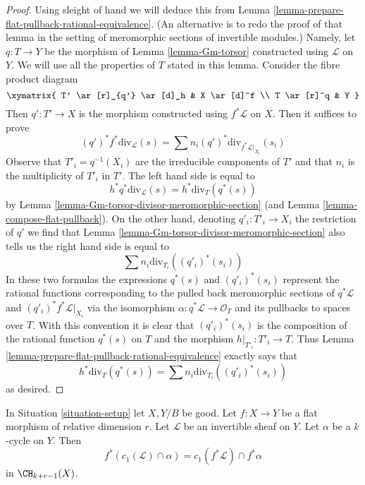 \begin{proof}
Using sleight of hand we will deduce this from
Lemma \ref{lemma-prepare-flat-pullback-rational-equivalence}.
(An alternative is to redo the proof of that lemma in the
setting of meromorphic sections of invertible modules.)
Namely, let $q : T \to Y$ be the morphism of
Lemma \ref{lemma-Gm-torsor} constructed using $\mathcal{L}$ on $Y$.
We will use all the properties of $T$ stated in this lemma.
Consider the fibre product diagram
$$
\xymatrix{
T' \ar[r]_{q'} \ar[d]_h & X \ar[d]^f \\
T \ar[r]^q & Y
}
$$
Then $q' : T' \to X$ is the morphism constructed using $f^*\mathcal{L}$
on $X$. Then it suffices to prove
$$
(q')^*f^*\text{div}_\mathcal{L}(s) =
\sum n_i (q')^*\text{div}_{f^*\mathcal{L}|_{X_i}}(s_i)
$$
Observe that $T'_i = q^{-1}(X_i)$ are the irreducible components of $T'$
and that $n_i$ is the multiplicity of $T'_i$ in $T'$.
The left hand side is equal to
$$
h^*q^*\text{div}_\mathcal{L}(s) = h^*\text{div}_T(q^*(s))
$$
by Lemma \ref{lemma-Gm-torsor-divisor-meromorphic-section}
(and Lemma \ref{lemma-compose-flat-pullback}).
On the other hand, denoting $q'_i : T'_i \to X_i$
the restriction of $q'$ we find that
Lemma \ref{lemma-Gm-torsor-divisor-meromorphic-section}
also tells us the right hand side is equal to
$$
\sum n_i \text{div}_{T_i}((q'_i)^*(s_i))
$$
In these two formulas the expressions $q^*(s)$ and $(q'_i)^*(s_i)$
represent the rational functions corresponding to the pulled back
meromorphic sections of $q^*\mathcal{L}$ and $(q'_i)^*f^*\mathcal{L}|_{X_i}$
via the isomorphism $\alpha : q^*\mathcal{L} \to \mathcal{O}_T$
and its pullbacks to spaces over $T$. With this convention it is
clear that $(q'_i)^*(s_i)$ is the composition of the rational function
$q^*(s)$ on $T$ and the morphism $h|_{T'_i} : T'_i \to T$.
Thus Lemma \ref{lemma-prepare-flat-pullback-rational-equivalence}
exactly says that
$$
h^*\text{div}_T(q^*(s)) = \sum n_i \text{div}_{T_i}((q'_i)^*(s_i))
$$
as desired.
\end{proof}

\begin{lemma}
\label{lemma-flat-pullback-cap-c1}
In Situation \ref{situation-setup} let $X, Y/B$ be good.
Let $f : X \to Y$ be a flat morphism of relative dimension $r$.
Let $\mathcal{L}$ be an invertible sheaf on $Y$.
Let $\alpha$ be a $k$-cycle on $Y$.
Then
$$
f^*(c_1(\mathcal{L}) \cap \alpha) = c_1(f^*\mathcal{L}) \cap f^*\alpha
$$
in $\CH_{k + r - 1}(X)$.
\end{lemma}


